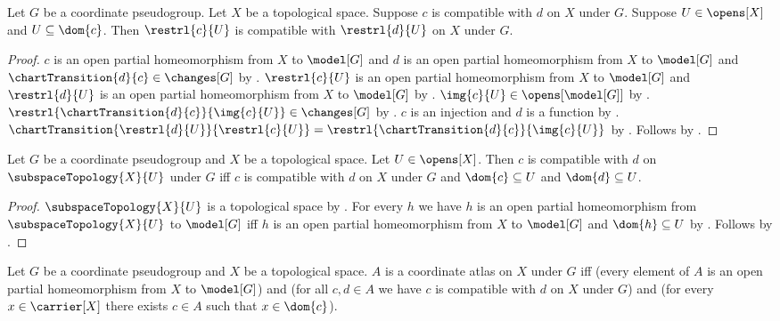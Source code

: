 \begin{theorem}\label{coordinate_compatibility_restriction}
    Let $G$ be a coordinate pseudogroup.
    Let $X$ be a topological space.
    Suppose $c$ is compatible with $d$ on $X$ under $G$.
    Suppose $U\in\opens[X]$ and $U\subseteq\dom{c}$.
    Then $\restrl{c}{U}$ is compatible with $\restrl{d}{U}$ on $X$ under $G$.
\end{theorem}
\begin{proof}
    $c$ is an open partial homeomorphism from $X$ to $\model[G]$ and
        $d$ is an open partial homeomorphism from $X$ to $\model[G]$ and
        $\chartTransition{d}{c}\in\changes[G]$ by .
    $\restrl{c}{U}$ is an open partial homeomorphism from $X$ to $\model[G]$ and
        $\restrl{d}{U}$ is an open partial homeomorphism from $X$ to $\model[G]$ by
        .
    $\img{c}{U}\in\opens[\model[G]]$ by .
    $\restrl{\chartTransition{d}{c}}{\img{c}{U}}\in\changes[G]$ by .
    $c$ is an injection and $d$ is a function by
        .
    $\chartTransition{\restrl{d}{U}}{\restrl{c}{U}}
        =\restrl{\chartTransition{d}{c}}{\img{c}{U}}$ by .
    Follows by .
\end{proof}

\begin{theorem}\label{coordinate_compatibility_open_subspace}
    Let $G$ be a coordinate pseudogroup and $X$ be a topological space.
    Let $U\in\opens[X]$.
    Then $c$ is compatible with $d$ on $\subspaceTopology{X}{U}$ under $G$ iff
        $c$ is compatible with $d$ on $X$ under $G$ and
        $\dom{c}\subseteq U$ and $\dom{d}\subseteq U$.
\end{theorem}
\begin{proof}
    $\subspaceTopology{X}{U}$ is a topological space by .
    For every $h$ we have
        $h$ is an open partial homeomorphism from $\subspaceTopology{X}{U}$ to $\model[G]$ iff
        $h$ is an open partial homeomorphism from $X$ to $\model[G]$ and $\dom{h}\subseteq U$ by
        .
    Follows by .
\end{proof}

\begin{definition}\label{coordinate_atlas}
    Let $G$ be a coordinate pseudogroup and $X$ be a topological space.
    $A$ is a coordinate atlas on $X$ under $G$ iff
        (every element of $A$ is an open partial homeomorphism from $X$ to $\model[G]$) and
        (for all $c,d\in A$ we have $c$ is compatible with $d$ on $X$ under $G$) and
        (for every $x\in\carrier[X]$ there exists $c\in A$ such that $x\in\dom{c}$).
\end{definition}

